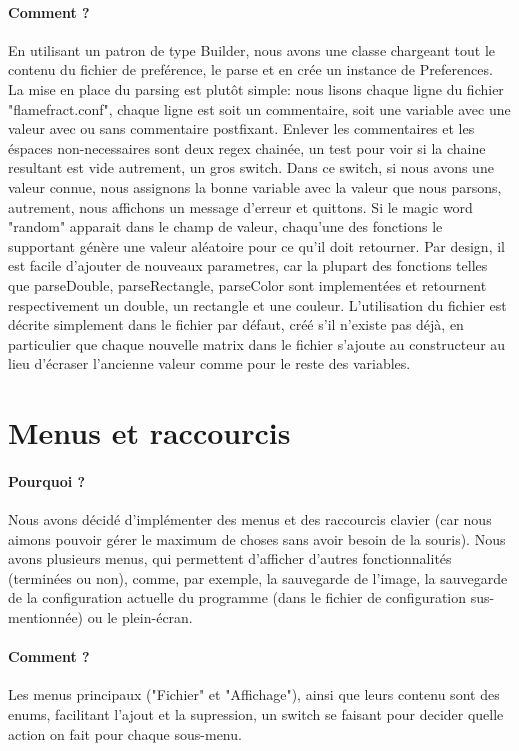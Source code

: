 \documentclass[a4paper]{report}
\begin{document}
\paragraph{Comment ?}
En utilisant un patron de type Builder, nous avons une classe chargeant tout le contenu du fichier de preférence, le parse et en crée un instance de Preferences. La mise en place du parsing est plutôt simple: nous lisons chaque ligne du fichier "flamefract.conf", chaque ligne est soit un commentaire, soit une variable avec une valeur avec ou sans commentaire postfixant. Enlever les commentaires et les éspaces non-necessaires sont deux regex chainée, un test pour voir si la chaine resultant est vide autrement, un gros switch. Dans ce switch, si nous avons une valeur connue, nous assignons la bonne variable avec la valeur que nous parsons, autrement, nous affichons un message d'erreur et quittons. Si le magic word "random" apparait dans le champ de valeur, chaqu'une des fonctions le supportant génère une valeur aléatoire pour ce qu'il doit retourner. Par design, il est facile d'ajouter de nouveaux parametres, car la plupart des fonctions telles que parseDouble, parseRectangle, parseColor sont implementées et retournent respectivement un double, un rectangle et une couleur. L'utilisation du fichier est décrite simplement dans le fichier par défaut, créé s'il n'existe pas déjà, en particulier que chaque nouvelle matrix dans le fichier s'ajoute au constructeur au lieu d'écraser l'ancienne valeur comme pour le reste des variables.

\section*{Menus et raccourcis}
\paragraph{Pourquoi ?}
Nous avons décidé d'implémenter des menus et des raccourcis clavier (car nous aimons pouvoir gérer le maximum de choses sans avoir besoin de la souris). Nous avons plusieurs menus, qui permettent d'afficher d'autres fonctionnalités (terminées ou non), comme, par exemple, la sauvegarde de l'image, la sauvegarde de la configuration actuelle du programme (dans le fichier de configuration sus-mentionnée) ou le plein-écran.

\paragraph{Comment ?}
Les menus principaux ("Fichier" et "Affichage"), ainsi que leurs contenu sont des enums, facilitant l'ajout et la supression, un switch se faisant pour decider quelle action on fait pour chaque sous-menu.
\end{document}
